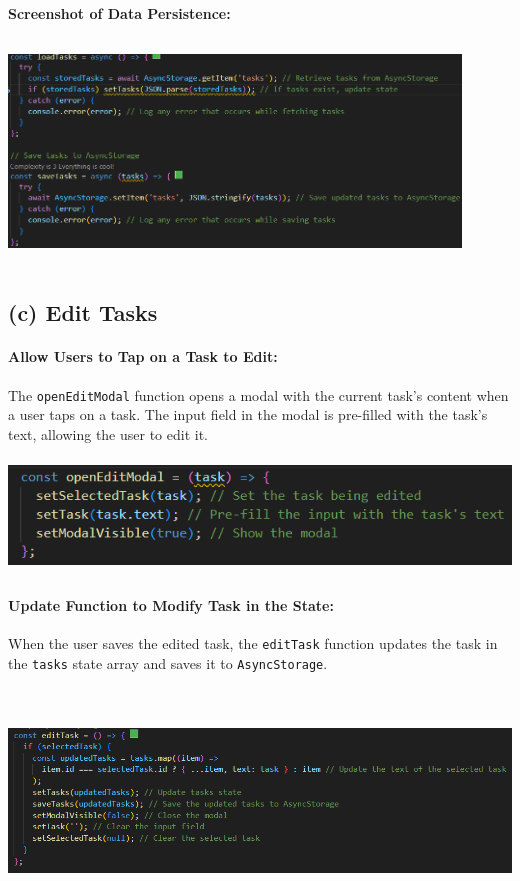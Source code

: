 \documentclass[12pt]{article}
\begin{document}
\textbf{Screenshot of Data Persistence:}
\begin{center}
    \includegraphics[width=0.9\textwidth, height=6cm]{images/async.png} 
\end{center}

\subsection*{(c) Edit Tasks}

\paragraph{Allow Users to Tap on a Task to Edit:}
The \texttt{openEditModal} function opens a modal with the current task's content when a user taps on a task. The input field in the modal is pre-filled with the task's text, allowing the user to edit it.
\begin{center}
    \includegraphics[width=\textwidth, height=3cm]{images/edittask1.png} 
\end{center}
\paragraph{Update Function to Modify Task in the State:}
When the user saves the edited task, the \texttt{editTask} function updates the task in the \texttt{tasks} state array and saves it to \texttt{AsyncStorage}.
\begin{center}
    \includegraphics[width=\textwidth, height=6cm]{images/edittask2.png} 
\end{center}
\end{document}
